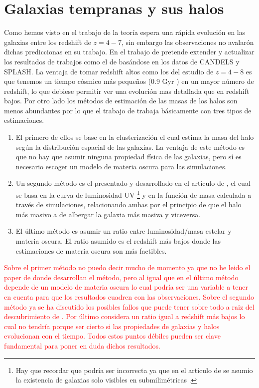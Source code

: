 \documentclass{article}
\begin{document}
\section*{Galaxias tempranas y sus halos}
Como hemos visto en el trabajo de \cite{finkelstein2015increasing} la teoría espera una rápida evolución en las galaxias entre los redshift de $z=4-7$, sin embargo las observaciones no avalarón dichas prediccionas en su trabajo. En el trabajo de \cite{steinhardt2016impossibly} pretende extender y actualizar los resultados de trabajos como el de \cite{finkelstein2015increasing} basándose en los datos de CANDELS y SPLASH. La ventaja de tomar redshift altos como los del estudio de $z=4-8$ es que tenemos un tiempo cósmico más pequeños (0.9 Gyr \citep{steinhardt2016impossibly}) en un mayor número de redshift, lo que debiese permitir ver una evolución mas detallada que en redshift bajos. Por otro lado los métodos de estimación de las masas de los halos son menos abundantes por lo que el trabajo de \cite{steinhardt2016impossibly} trabaja básicamente con tres tipos de estimaciones.
\begin{enumerate}
\item El primero de ellos se base en la clusterización \citep{hildebrandt2009cars} el cual estima la masa del halo según la distribución espacial de las galaxias. La ventaja de este método es que no hay que asumir ninguna propiedad física de las galaxias, pero sí es necesario escoger un modelo de materia oscura para las simulaciones.
\item Un segundo método es el presentado y desarrollado en el artículo de \cite{finkelstein2015increasing}, el cual se basa en la curva de luminosidad UV \footnote{Hay que recordar que podría ser incorrecta ya que en el artículo de se asumio la existencia de galaxias solo visibles en submilimétricas \citep{wang2019dominant}.} y en la función de masa calculada a través de simulaciones, relacionando ambas por el principio de que el halo más masivo a de albergar la galaxia más masiva y viceversa.
\item El último método es asumir un ratio entre luminosidad/masa estelar y materia oscura. El ratio asumido es el redshift más bajos donde las estimaciones de materia oscura son más factibles.
\end{enumerate}

\textcolor{red}{Sobre el primer método no puedo decir mucho de momento ya que no he leido el paper de \cite{hildebrandt2009cars} donde desarrollan el método, pero al igual que en el último método depende de un modelo de materia oscura lo cual podría ser una variable a tener en cuenta para que los resultados cuadren con las observaciones. Sobre el segundo método ya se ha discutido los posibles fallos que puede tener sobre todo a raiz del descubrimiento de \cite{wang2019dominant}. Por último considera un ratio igual a redshift más bajos lo cual no tendría porque ser cierto si las propiedades de galaxias y halos evolucionan con el tiempo. Todos estos puntos débiles pueden ser clave fundamental para poner en duda dichos resultados.}\\


\newpage



\newpage
\appendix

\end{document}
